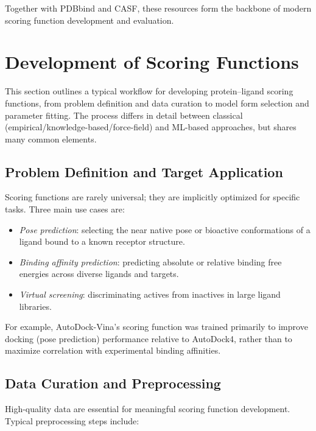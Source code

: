 \documentclass[12pt]{article}
\begin{document}
Together with PDBbind and CASF, these resources form the backbone of modern scoring function development and evaluation.

\section{Development of Scoring Functions}

This section outlines a typical workflow for developing protein--ligand scoring functions, from problem definition and data curation to model form selection and parameter fitting. The process differs in detail between classical (empirical/knowledge-based/force-field) and ML-based approaches, but shares many common elements.\cite{CH3_Wang2017}

\subsection{Problem Definition and Target Application}

Scoring functions are rarely universal; they are implicitly optimized for specific tasks. Three main use cases are:
\begin{itemize}
    \item \textit{Pose prediction}: selecting the near native pose or bioactive conformations of a ligand bound to a known receptor structure.
    \item \textit{Binding affinity prediction}: predicting absolute or relative binding free energies across diverse ligands and targets.
    \item \textit{Virtual screening}: discriminating actives from inactives in large ligand libraries.
\end{itemize}

For example, AutoDock-Vina's scoring function was trained primarily to improve docking (pose prediction) performance relative to AutoDock4, rather than to maximize correlation with experimental binding affinities.\cite{CH3_Trott2010_Vina}

\subsection{Data Curation and Preprocessing}

High-quality data are essential for meaningful scoring function development\cite{CH3_Wang2005_PDBbind,CH3_Liu2015_PDBbind}. Typical preprocessing steps include:
\end{document}
